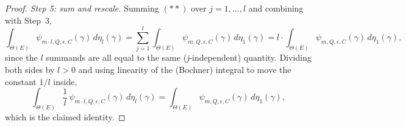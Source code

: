 \begin{proof}
  \emph{Step 5: sum and rescale.} Summing $(\ast\ast)$ over $j=1,\dotsc,l$ and combining with
  Step~3,
  \[
    \int_{\Theta(E)} \psi_{m\cdot l,Q,\epsilon,C}(\gamma) \, d\eta_l(\gamma)
    = \sum_{j=1}^l \int_{\Theta(E)} \psi_{m,Q,\epsilon,C}(\gamma) \, d\eta_1(\gamma)
    = l \cdot \int_{\Theta(E)} \psi_{m,Q,\epsilon,C}(\gamma) \, d\eta_1(\gamma)
    ,
  \]
  since the $l$ summands are all equal to the same (\emph{j}-independent) quantity. Dividing both
  sides by $l>0$ and using linearity of the (Bochner) integral to move the constant $1/l$ inside,
  \[
    \int_{\Theta(E)} \frac1l\,\psi_{m\cdot l,Q,\epsilon,C}(\gamma) \, d\eta_l(\gamma)
    = \int_{\Theta(E)} \psi_{m,Q,\epsilon,C}(\gamma) \, d\eta_1(\gamma)
    ,
  \]
  which is the claimed identity.
\end{proof}
